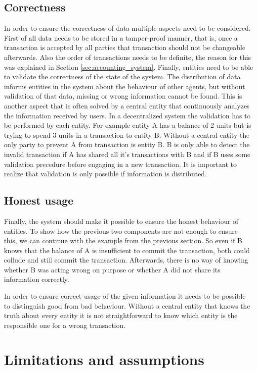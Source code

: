 \subsection{Correctness}
In order to ensure the correctness of data multiple aspects need to be considered. First of all data needs
to be stored in a tamper-proof manner, that is, once a transaction is accepted by all parties that transaction
should not be changeable afterwards. Also the order of transactions needs to be definite, the reason for 
this was explained in Section \ref{sec:accounting_system}. Finally, entities need to be able to validate the
correctness of the state of the system.
The distribution of data informs entities in the system about the behaviour of other agents, but without
validation of that data, missing or wrong information cannot be found. This is another aspect that is often
solved by a central entity that continuously analyzes the information received by users. In a decentralized
system the validation has to be performed by each entity. For example entity A has a balance of 2 units but
is trying to spend 3 units in a transaction to entity B. Without a central entity the only party to
prevent A from transaction is entity B. B is only able to detect the invalid transaction if A has shared all
it's transactions with B and if B uses some validation precedure before engaging in a new transaction. It is
important to realize that validation is only possible if information is distributed. 

\subsection{Honest usage}
Finally, the system should make it possible to ensure the honest behaviour of entities. To show how the 
previous two components are not enough to ensure this, we can continue with the example from the previous
section. So even if B knows that the balance of A is insufficient to commit the transaction, both could 
collude and still commit the transaction. Afterwards, there is no way of knowing whether B was acting 
wrong on purpose or whether A did not share its information correctly. 

In order to ensure correct usage of the given information it needs to be possible to distinguish good from
bad behaviour. Without a central entity that knows the truth about every entity it is not straightforward to 
know which entity is the responsible one for a wrong transaction.


\section{Limitations and assumptions}